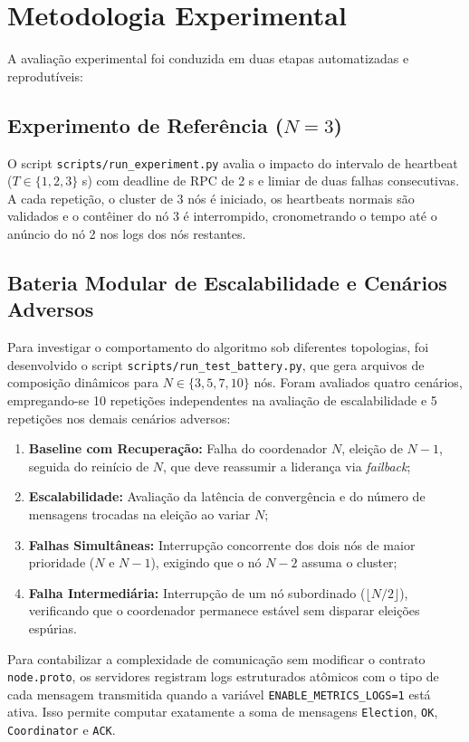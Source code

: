 \section{Metodologia Experimental}
\label{sec:experimentos}

A avaliação experimental foi conduzida em duas etapas automatizadas e reprodutíveis:

\subsection{Experimento de Referência (\texorpdfstring{$N=3$}{N=3})}
O script \texttt{scripts/run\_experiment.py} avalia o impacto do intervalo de
heartbeat ($T \in \{1, 2, 3\}$ s) com deadline de RPC de 2 s e limiar de duas
falhas consecutivas. A cada repetição, o cluster de 3 nós é iniciado, os
heartbeats normais são validados e o contêiner do nó 3 é interrompido,
cronometrando o tempo até o anúncio do nó 2 nos logs dos nós restantes.

\subsection{Bateria Modular de Escalabilidade e Cenários Adversos}
Para investigar o comportamento do algoritmo sob diferentes topologias, foi
desenvolvido o script \texttt{scripts/run\_test\_battery.py}, que gera
arquivos de composição dinâmicos para $N \in \{3, 5, 7, 10\}$ nós. Foram
avaliados quatro cenários, empregando-se 10 repetições independentes na
avaliação de escalabilidade e 5 repetições nos demais cenários adversos:
\begin{enumerate}
    \item \textbf{Baseline com Recuperação:} Falha do coordenador $N$, eleição de
    $N-1$, seguida do reinício de $N$, que deve reassumir a liderança via
    \textit{failback};
    \item \textbf{Escalabilidade:} Avaliação da latência de convergência e do
    número de mensagens trocadas na eleição ao variar $N$;
    \item \textbf{Falhas Simultâneas:} Interrupção concorrente dos dois nós de
    maior prioridade ($N$ e $N-1$), exigindo que o nó $N-2$ assuma o cluster;
    \item \textbf{Falha Intermediária:} Interrupção de um nó subordinado
    ($\lfloor N/2 \rfloor$), verificando que o coordenador permanece estável sem
    disparar eleições espúrias.
\end{enumerate}

Para contabilizar a complexidade de comunicação sem modificar o contrato
\texttt{node.proto}, os servidores registram logs estruturados atômicos com o tipo
de cada mensagem transmitida quando a variável \texttt{ENABLE\_METRICS\_LOGS=1}
está ativa. Isso permite computar exatamente a soma de mensagens \texttt{Election},
\texttt{OK}, \texttt{Coordinator} e \texttt{ACK}.

